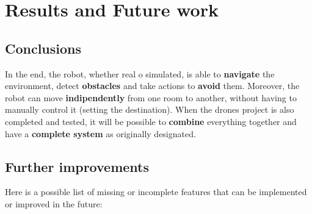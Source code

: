 \chapter{Results and Future work}
\label{cha:futureworks}

\section{Conclusions}

In the end, the robot, whether real o simulated, is able to \textbf{navigate} the environment, detect \textbf{obstacles} and take actions to \textbf{avoid} them. Moreover, the robot can move \textbf{indipendently} from one room to another, without having to manually control it (setting the destination). When the drones project is also completed and tested, it will be possible to \textbf{combine} everything together and have a \textbf{complete system} as originally designated.

\section{Further improvements}

Here is a possible list of missing or incomplete features that can be implemented or improved in the future:

